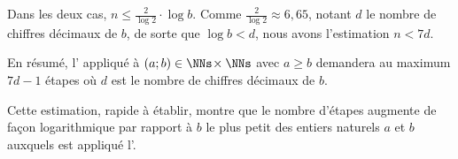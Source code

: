Dans les deux cas, $n \leq \frac{2}{\log 2} \cdot \log b$.
Comme $\frac{2}{\log 2} \approx 6,65$, notant $d$ le nombre de chiffres décimaux de $b$, de sorte que $\log b < d$, nous avons l'estimation $n < 7d$.


\medskip


En résumé, l'\algoeucl{} appliqué à $(a ; b) \in \NNs \!\times \NNs$ avec $a \geq b$ demandera au maximum $7d - 1$ étapes où $d$ est le nombre de chiffres décimaux de $b$.


\begin{remark}
	Cette estimation, rapide à établir, montre que le nombre d'étapes augmente de façon logarithmique par rapport à $b$ le plus petit des entiers naturels $a$ et $b$ auxquels est appliqué l'\algoeucl.
\end{remark}

